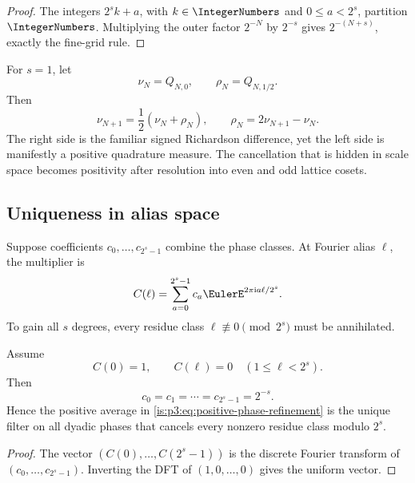 \begin{proof}
The integers $2^sk+a$, with $k\in\IntegerNumbers$ and $0\le a<2^s$, partition $\IntegerNumbers$.  Multiplying the outer factor $2^{-N}$ by $2^{-s}$ gives $2^{-(N+s)}$, exactly the fine-grid rule.
\end{proof}

For $s=1$, let
\[
 \nu_N=Q_{N,0},
 \qquad
 \rho_N=Q_{N,1/2}.
\]
Then
\begin{equation}
 \nu_{N+1}=\frac12(\nu_N+\rho_N),
 \qquad
 \boxed{\rho_N=2\nu_{N+1}-\nu_N.}
 \label{is:p3:eq:midpoint-Richardson}
\end{equation}
The right side is the familiar signed Richardson difference, yet the left side is manifestly a positive quadrature measure.  The cancellation that is hidden in scale space becomes positivity after resolution into even and odd lattice cosets.

\subsection{Uniqueness in alias space}

Suppose coefficients $c_0,\ldots,c_{2^s-1}$ combine the phase classes.  At Fourier alias $\ell$, the multiplier is
\begin{equation}
 C(\ell)=\sum_{a=0}^{2^s-1}c_a\EulerE^{2\pi\iu a\ell/2^s}.
 \label{is:p3:eq:DFT-filter}
\end{equation}
To gain all $s$ degrees, every residue class $\ell\not\equiv0\pmod{2^s}$ must be annihilated.

\begin{theorem}
\label{is:p3:thm:unique-phase-filter}
Assume
\begin{equation}
 C(0)=1,
 \qquad
 C(\ell)=0\quad(1\le\ell<2^s).
 \label{is:p3:eq:DFT-conditions}
\end{equation}
Then
\begin{equation}
 c_0=c_1=\cdots=c_{2^s-1}=2^{-s}.
 \label{is:p3:eq:unique-uniform-filter}
\end{equation}
Hence the positive average in \eqref{is:p3:eq:positive-phase-refinement} is the unique filter on all dyadic phases that cancels every nonzero residue class modulo $2^s$.
\end{theorem}

\begin{proof}
The vector $(C(0),\ldots,C(2^s-1))$ is the discrete Fourier transform of $(c_0,\ldots,c_{2^s-1})$.  Inverting the DFT of $(1,0,\ldots,0)$ gives the uniform vector.
\end{proof}

